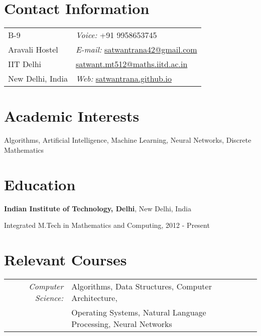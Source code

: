 \documentclass[margin,line]{res}
\newenvironment{list1}{
  \begin{list}{\ding{113}}{%
      \setlength{\itemsep}{0in}
      \setlength{\parsep}{0in} \setlength{\parskip}{0in}
      \setlength{\topsep}{0in} \setlength{\partopsep}{0in} 
      \setlength{\leftmargin}{0.17in}}}{\end{list}}
\begin{document}

\begin{resume}
\section{\sc Contact Information}
\vspace{.05in}
\begin{tabular}{@{}p{2in}p{8in}}
B-9             & {\it Voice:}  +91 9958653745 \\            
Aravali Hostel   & {\it E-mail:}  \href{mailto:satwantrana42@gmail.com}{satwantrana42@gmail.com} \\         
IIT Delhi &  \hspace{11.6 mm} \href{mailto:satwant.mt512@maths.iitd.ac.in}{satwant.mt512@maths.iitd.ac.in}\\   
New Delhi, India  & {\it Web:}  \href{http://satwantrana.github.io}{satwantrana.github.io}\\   
\end{tabular}


\section{\sc Academic Interests}
Algorithms, Artificial Intelligence, Machine Learning, Neural Networks, Discrete Mathematics

\section{\sc Education}
{\bf Indian Institute of Technology, Delhi}, New Delhi, India\\
\vspace*{-.1in}
\begin{list1}
\item[] Integrated M.Tech in Mathematics and Computing,  2012 - Present
\end{list1}

\section{\sc Relevant Courses}

\begin{tabular}{rlp{5cm}}

\em{Computer Science:} & Algorithms, Data Structures, Computer Architecture,
\\ & Operating Systems, Natural Language Processing, Neural Networks  \\


\end{tabular}
\end{resume}
\end{document}
